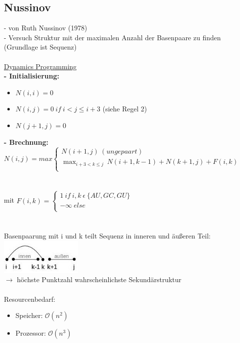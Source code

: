 \subsection{Nussinov}
 - von Ruth Nussinov (1978)\\
 - Versuch Struktur mit der maximalen Anzahl der Basenpaare zu finden (Grundlage ist Sequenz)
\\\\
\underline{Dynamics Programming}\\
\textbf{ - Initialisierung:}
\begin{itemize}
	\item $N(i,i) = 0$
	\item $N(i,j)=0\ if\ i<j\le i+3$ (siehe Regel 2)
	\item $N(j+1, j) = 0$
\end{itemize}
\textbf{- Brechnung:}\\
$N(i,j)=max \begin{cases}
               N(i+1, j)\ (ungepaart)\\
               \displaystyle\max_{i+3<k \le j}\ N(i+1, k-1) + N(k+1, j) + F(i,k)\\
\end{cases}$
\\\\\\
mit $F(i,k)= \begin{cases}
               1\ if\ i,k\ \epsilon\ \{AU, GC, GU\}\\
               -\infty\ else\\
\end{cases}$
\\\\\\
Basenpaarung mit i und k teilt Sequenz in inneren und äußeren Teil:\\
\includegraphics[width=0.3\textwidth]{lectures/160404/pix/pairing.jpg}
\\
$\rightarrow$ höchste Punktzahl wahrscheinlichste Sekundärstruktur
\\\\
Resourcenbedarf:
\begin{itemize}
	\item Speicher: $\mathcal{O}(n^2)$
	\item Prozessor: $\mathcal{O}(n^3)$
\end{itemize}